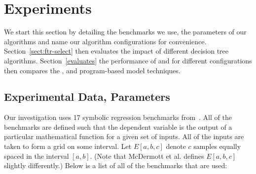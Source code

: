 
\section{Experiments}\label{sect:experiments}

We start this section by detailing the benchmarks we use, the parameters of our algorithms and name our algorithm configurations for convenience. Section~\ref{sect:ftr-select} then evaluates the impact of different decision tree algorithms. Section~\ref{evaluates} the performance of \FULL and \DRAW for different configurations then compares the \FULL, \DRAW and program-based model techniques.
 
\subsection{Experimental Data, Parameters}\label{sect:data_sets}

Our investigation uses 17 symbolic regression benchmarks from~. All of the benchmarks are defined such that the dependent variable is the output of a particular mathematical function for a given set of inputs.  All of the inputs are taken to form a grid on some interval.  Let $E[a, b, c]$ denote $c$ samples equally spaced in the interval $[a,b]$. (Note that McDermott et al. defines $E[a, b, c]$ slightly differently.)  Below is a list of all of the benchmarks that are used:

